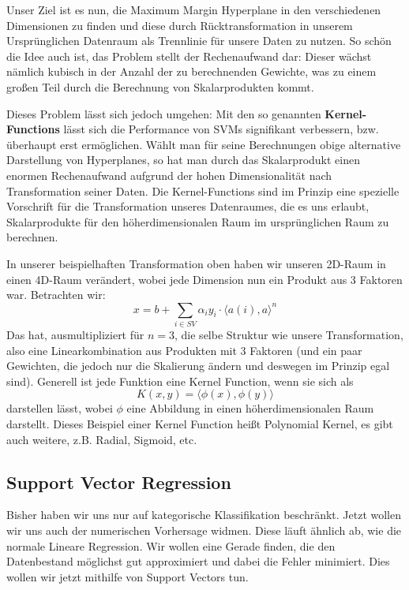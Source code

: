Unser Ziel ist es nun, die Maximum Margin Hyperplane in den verschiedenen
Dimensionen zu finden und diese durch Rücktransformation in unserem
Ursprünglichen Datenraum als Trennlinie für unsere Daten zu nutzen.
So schön die Idee auch ist, das Problem stellt der Rechenaufwand dar:
Dieser wächst nämlich kubisch in der Anzahl der zu berechnenden 
Gewichte, was zu einem großen Teil durch die Berechnung von 
Skalarprodukten kommt.

Dieses Problem lässt sich jedoch umgehen: Mit den so genannten
\textbf{Kernel-Functions} lässt sich die Performance von SVMs
signifikant verbessern, bzw. überhaupt erst ermöglichen. Wählt man
für seine Berechnungen obige alternative Darstellung von Hyperplanes,
so hat man durch das Skalarprodukt einen enormen Rechenaufwand 
aufgrund der hohen Dimensionalität nach Transformation seiner Daten.
Die Kernel-Functions sind im Prinzip eine spezielle Vorschrift für die
Transformation unseres Datenraumes, die es uns erlaubt, Skalarprodukte
für den höherdimensionalen Raum im ursprünglichen Raum zu berechnen.

In unserer beispielhaften Transformation oben haben wir unseren
2D-Raum in einen 4D-Raum verändert, wobei jede Dimension nun
ein Produkt aus 3 Faktoren war. Betrachten wir:
\[
x = b + \sum _{i \in SV} \alpha_i y_i \cdot \langle a(i),a\rangle^n
\]
Das hat, ausmultipliziert für \(n=3\), die selbe Struktur wie 
unsere Transformation,
also eine Linearkombination aus Produkten mit 3 Faktoren (und ein
paar Gewichten, die jedoch nur die Skalierung ändern und deswegen
im Prinzip egal sind). 
Generell ist jede Funktion eine Kernel Function, wenn sie sich als
\[
K(x,y) = \langle \phi(x), \phi(y)\rangle
\]
darstellen lässt, wobei \(\phi\) eine Abbildung in einen höherdimensionalen
Raum darstellt. Dieses Beispiel einer Kernel Function heißt Polynomial
Kernel, es gibt auch weitere, z.B. Radial, Sigmoid, etc.

\subsection{Support Vector Regression}
Bisher haben wir uns nur auf kategorische Klassifikation beschränkt.
Jetzt wollen wir uns auch der numerischen Vorhersage widmen. Diese
läuft ähnlich ab, wie die normale Lineare Regression. Wir wollen eine
Gerade finden, die den Datenbestand möglichst gut approximiert und dabei
die Fehler minimiert. Dies wollen wir jetzt mithilfe von Support Vectors tun.


